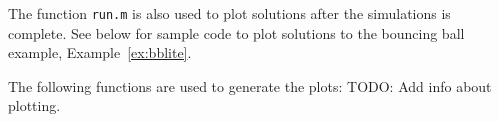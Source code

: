 \documentclass{article}
\begin{document}
The function {\tt run.m} is also used to plot solutions after the simulations is complete. 
See below for sample code to plot solutions to the bouncing ball example, Example~\ref{ex:bblite}.

% 
\label{scr:postprocesing}

\noindent The following functions are used to generate the plots:
{\color{red} TODO: Add info about plotting.}
\end{document}
